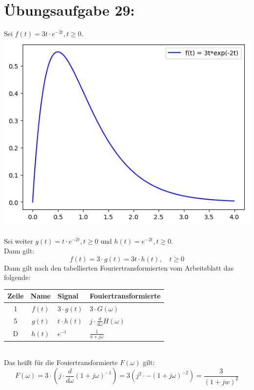 

	\section*{Übungsaufgabe 29:}
		Sei $f(t) = 3t\cdot e^{-2t}, t\ge 0$.\\
		\includegraphics[scale = 0.7]{A29_graphPlot.png}\\
		\\
		Sei weiter $g(t) = t\cdot e^{-2t}, t\ge 0$ und $h(t)=e^{-2t}, t\ge 0$.\\
		Dann gilt:
		$$ f(t) = 3\cdot g(t) = 3t \cdot h(t),\quad t\ge 0$$
		Dann gilt nach den tabellierten Fouriertransformierten vom Arbeitsblatt das folgende:\\
		\begin{tabular}{c | c | l | l}
			Zeile	&	 Name	&	Signal			&	Fouiertransformierte\\
			\hline
			1		&	$f(t)$	&	$3 \cdot g(t)$	&	$3\cdot G(\omega)$\\
			5		&	$g(t)$	&	$t \cdot h(t)$	&	$j\cdot \frac{d}{d\omega}H(\omega)$\\
			D		&	$h(t)$	&	$e^{-t}$		&	$\frac{1}{a+j\omega}$
		\end{tabular}\\
		Das heißt für die Fouiertransformierte $F(\omega)$ gilt:
		$$F(\omega) = 3\cdot \left(j\cdot \frac{d}{d\omega}\left(1+j\omega\right)^{-1}\right) = 3\left(j^2\cdot -\left(1+j\omega\right)^{-2}\right) = \frac{3}{(1+jw)^2}$$
